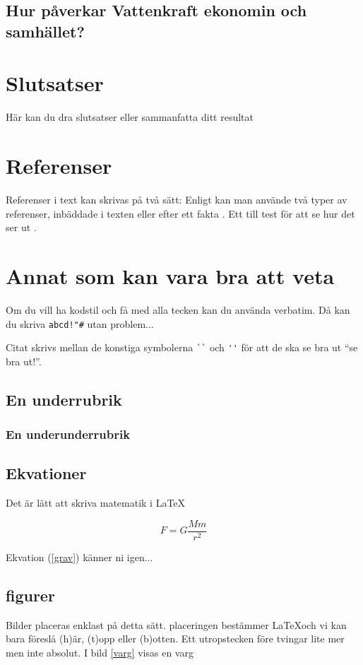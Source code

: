 \documentclass[11p]{article}
\begin{document}
 \subsection{Hur påverkar Vattenkraft ekonomin och samhället?}


 \section{Slutsatser}
 Här kan du dra slutsatser eller sammanfatta ditt resultat


 \section{Referenser}
 Referenser i text kan skrivas på två sätt: Enligt \textcite{Jens} kan man använde två typer av referenser, inbäddade i texten eller efter ett fakta \parencite{Fraenkel}. Ett till test för att se hur det ser ut \parencite[sid 55]{fermi}.

 \section{Annat som kan vara bra att veta}
 Om du vill ha kodstil och få med alla tecken kan du använda verbatim. Då kan du skriva \verb|abcd!"#| utan problem...

 Citat skrivs mellan de konstiga symbolerna \verb|``| och \verb|''| för att de ska se bra ut ``se bra ut!''.
 \subsection{En underrubrik}
 \subsubsection{En underunderrubrik}
 \subsection{Ekvationer}
 Det är lätt att skriva matematik i \LaTeX


 \begin{equation}
  F = G \frac{M m}{r^2}
  \label{grav}
 \end{equation}

 Ekvation (\ref{grav}) känner ni igen...

 \subsection{figurer}
 Bilder placeras enklast på detta sätt. placeringen bestämmer \LaTeX och vi kan bara föreslå (h)är, (t)opp eller (b)otten. Ett utropstecken före tvingar lite mer men inte absolut. I bild \ref{varg} visas en varg

 \printbibliography
\end{document}
